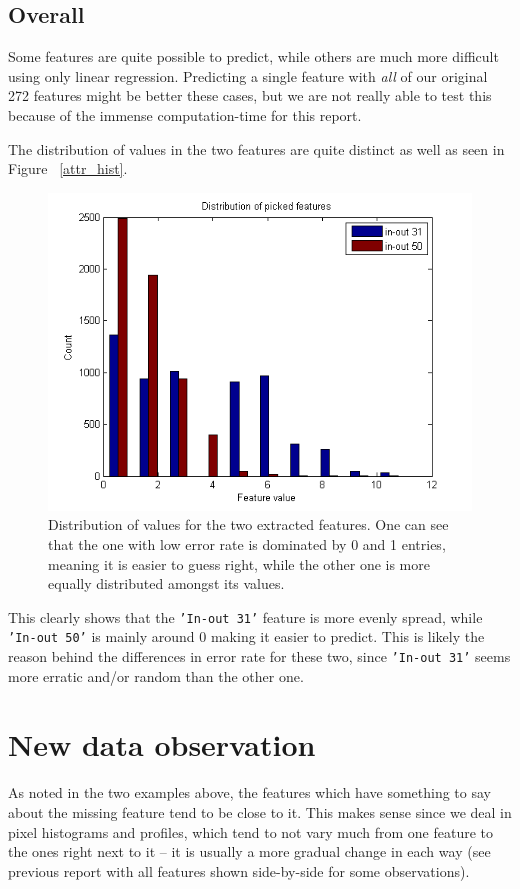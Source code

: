 \subsection*{Overall}
Some features are quite possible to predict, while others are much more difficult using only linear regression. Predicting a single feature with \emph{all} of our original 272 features might be better these cases, but we are not really able to test this because of the immense computation-time for this report.

The distribution of values in the two features are quite distinct as well as seen in Figure ~\ref{attr_hist}.

\begin{figure}[H]
\centering
\includegraphics[width=0.6\linewidth]{code/attribute_histograms}
\caption{Distribution of values for the two extracted features. One can see that the one with low error rate is dominated by 0 and 1 entries, meaning it is easier to guess right, while the other one is more equally distributed amongst its values.}
\label{fig:attr_hist}
\end{figure}

This clearly shows that the \texttt{'In-out 31'} feature is more evenly spread, while \texttt{'In-out 50'} is mainly around 0 making it easier to predict. This is likely the reason behind the differences in error rate for these two, since \texttt{'In-out 31'} seems more erratic and/or random than the other one.

\section{New data observation}
As noted in the two examples above, the features which have something to say about the missing feature tend to be close to it. This makes sense since we deal in pixel histograms and profiles, which tend to not vary much from one feature to the ones right next to it -- it is usually a more gradual change in each way (see previous report with all features shown side-by-side for some observations).



